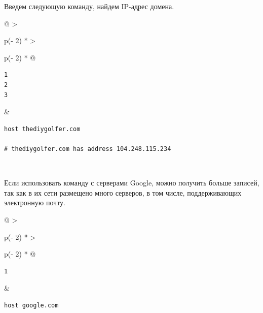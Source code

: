 \documentclass{report}
\begin{document}
Введем следующую команду, найдем IP-адрес домена.

\begin{longtable}[]{@{}
  >{\raggedright\arraybackslash}p{(\columnwidth - 2\tabcolsep) * }
  >{\raggedright\arraybackslash}p{(\columnwidth - 2\tabcolsep) * }@{}}
\toprule
\endhead
\begin{minipage}[t]{\linewidth}\raggedright
\begin{verbatim}
1
2
3
\end{verbatim}
\end{minipage} & \begin{minipage}[t]{\linewidth}\raggedright
\begin{verbatim}
host thediygolfer.com

# thediygolfer.com has address 104.248.115.234
\end{verbatim}
\end{minipage} \\ \addlinespace
\bottomrule
\end{longtable}

Если использовать команду с серверами Google, можно получить больше
записей, так как в их сети размещено много серверов, в том числе,
поддерживающих электронную почту.

\begin{longtable}[]{@{}
  >{\raggedright\arraybackslash}p{(\columnwidth - 2\tabcolsep) * }
  >{\raggedright\arraybackslash}p{(\columnwidth - 2\tabcolsep) * }@{}}
\toprule
\endhead
\begin{minipage}[t]{\linewidth}\raggedright
\begin{verbatim}
1
\end{verbatim}
\end{minipage} & \begin{minipage}[t]{\linewidth}\raggedright
\begin{verbatim}
host google.com
\end{verbatim}
\end{minipage} \\ \addlinespace
\bottomrule
\end{longtable}
\end{document}
